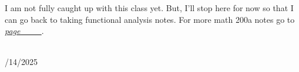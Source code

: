 \documentclass{book}
\newcommand{\inLinkRap}[2]{{\color{blue}\hyperlink{#1}{\textit{#2}}}}
\newcommand{\mySepTwo}[1][.]{%
   {\noindent\color{#1}{\rule{6.5in}{0.5mm}}}\\%
}
\newcommand{\retTwo}{\hfill\bigbreak}
\newcommand{\dispDate}[1]{{
   \color{Black}%
   \fontsize{20}{18}\selectfont%
   #1\retTwo
}}
\begin{document}
I am not fully caught up with this class yet. But, I'll stop here for now so that I can go back to taking functional analysis notes. For more math 200a notes go to \inLinkRap{math 200a lecture 7}{page \_\_\_}.

\mySepTwo

\dispDate{10/14/2025}



\hypertarget{Ergodic reading group notes 3}{}

\hypertarget{more function analysis lectures 3-5}{}
\hypertarget{existence and uniqueness diff eq notes}{}

\hypertarget{page 251 reference}{}
\hypertarget{page 271 reference}{}
\hypertarget{Alireza theorem page 271}{}

\hypertarget{math 241a lecture 4}{}
\hypertarget{math 200a lecture 7}{}
\hypertarget{math 220a lecture 8}{}
\end{document}
